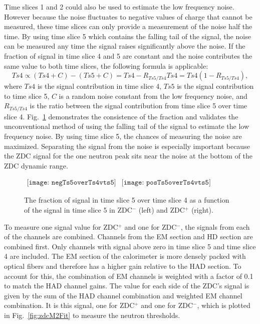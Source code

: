       Time slices 1 and 2 could also be used to estimate the low frequency 
        noise.
      However because the noise fluctuates to negative values of charge that 
        cannot be measured, these time slices can only provide a 
        measurement of the noise half the time. 
      By using time slice 5 which contains the falling tail of the signal, 
        the noise can be measured any time the signal raises significantly 
        above the noise.
      If the fraction of signal in time slice 4 and 5 are constant and
        the noise contributes the same value to both time slices, the 
        following formula is applicable:
      \begin{equation}
        Ts4 \propto (Ts4 + C) - ( Ts5 + C ) = Ts4 - R_{Ts5/Ts4}Ts4 
        = Ts4(1-R_{Ts5/Ts4}),
        \label{eq:ts4ish}
      \end{equation}
      where $Ts4$ is the signal contribution in time slice 4, $Ts5$ is the 
        signal contribution to time slice 5, $C$ is a random noise constant
        from the low frequency noise, and $R_{Ts5/Ts4}$ is the ratio between
        the signal contribution from time slice 5 over time slice 4.
      Fig.~\ref{fig:zdcTs4OvTs5VTs5} demonstrates the consistence of the 
        fraction and validates the unconventional method of using the falling 
        tail of the signal to estimate the low frequency noise. 
      By using time slice 5, the chances of measuring the noise are maximized. 
      Separating the signal from the noise is especially important because
        the ZDC signal for the one neutron peak sits near the noise at the 
        bottom of the ZDC dynamic range.
      \begin{figure}[!Hhbt]
        \centering
        $ \begin{array}{cc}
          \texttt{[image: negTs5overTs4vts5]} &
          \texttt{[image: posTs5overTs4vts5]}
        \end{array} $  
        \caption{ The fraction of signal in time slice 5 over time slice 4 
          as a function of the signal in time slice 5 in ZDC$^{-}$ (left) and 
          ZDC$^{+}$ (right).}
        \label{fig:zdcTs4OvTs5VTs5}
      \end{figure}

      To measure one signal value for ZDC$^{+}$ and one for ZDC$^{-}$, the 
        signals from each of the channels are combined.
      Channels from the EM section and HD section are combined first. 
      Only channels with signal above zero in time slice 5 and time slice 
        4 are included. 
      The EM section of the calorimeter is more densely packed with optical 
        fibers and therefore has a higher gain relative to the HAD section. 
      To account for this, the combination of EM channels is weighted with
        a factor of 0.1 to match the HAD channel gains.
      The value for each side of the ZDC's signal is given by the sum of the 
        HAD channel combination and weighted EM channel combination.
      It is this signal, one for ZDC$^{+}$ and one for ZDC$^{-}$, 
        which is plotted in Fig.~\ref{fig:zdcM2Fit} to measure the neutron 
        thresholds.

